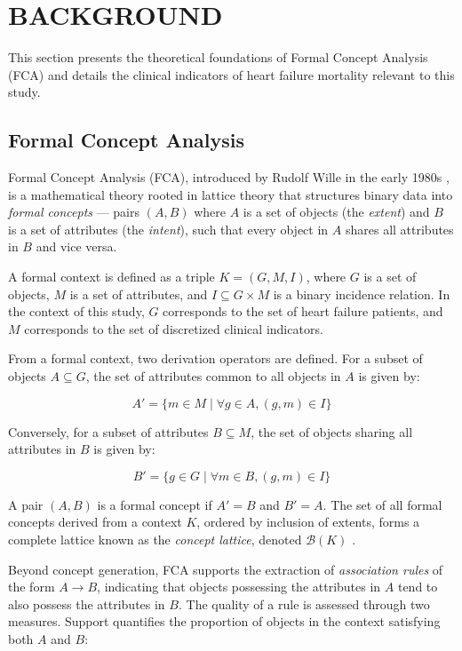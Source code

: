 \documentclass[a4paper,twoside]{article}
\begin{document}
\section{\uppercase{Background}}
\label{sec:background}

This section presents the theoretical foundations of Formal Concept Analysis (FCA) and details the clinical indicators of heart failure mortality relevant to this study.

\subsection{Formal Concept Analysis}

Formal Concept Analysis (FCA), introduced by Rudolf Wille in the early 1980s \cite{Wille1982}, is a mathematical theory rooted in lattice theory that structures binary data into \emph{formal concepts} --- pairs $(A,B)$ where $A$ is a set of objects (the \emph{extent}) and $B$ is a set of attributes (the \emph{intent}), such that every object in $A$ shares all attributes in $B$ and vice versa.

A formal context is defined as a triple $K = (G,M,I)$, where $G$ is a set of objects, $M$ is a set of attributes, and $I \subseteq G \times M$ is a binary incidence relation. In the context of this study, $G$ corresponds to the set of heart failure patients, and $M$ corresponds to the set of discretized clinical indicators.

From a formal context, two derivation operators are defined. For a subset of objects $A \subseteq G$, the set of attributes common to all objects in $A$ is given by:

\begin{equation}
A' = \{m \in M \mid \forall g \in A, (g,m) \in I\}
\end{equation}

Conversely, for a subset of attributes $B \subseteq M$, the set of objects sharing all attributes in $B$ is given by:

\begin{equation}
B' = \{g \in G \mid \forall m \in B, (g,m) \in I\}
\end{equation}

A pair $(A,B)$ is a formal concept if $A' = B$ and $B' = A$. The set of all formal concepts derived from a context $K$, ordered by inclusion of extents, forms a complete lattice known as the \emph{concept lattice}, denoted $\mathcal{B}(K)$ \cite{GanterWille1999}.

Beyond concept generation, FCA supports the extraction of \emph{association rules} of the form $A \rightarrow B$, indicating that objects possessing the attributes in $A$ tend to also possess the attributes in $B$. The quality of a rule is assessed through two measures. Support quantifies the proportion of objects in the context satisfying both $A$ and $B$:
\end{document}
